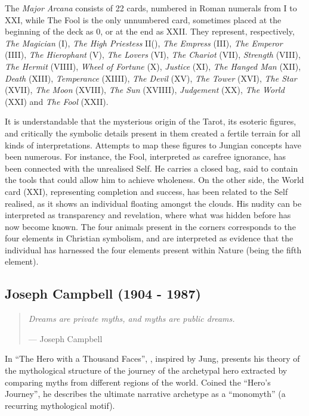 \documentclass[
]{book}
\begin{document}
The \emph{Major Arcana} consists of 22 cards, numbered in Roman numerals from I to XXI, while The Fool is the only unnumbered card, sometimes placed at the beginning of the deck as 0, or at the end as XXII. They represent, respectively, \emph{The Magician} (I), \emph{The High Priestess} II(), \emph{The Empress} (III), \emph{The Emperor} (IIII), \emph{The Hierophant} (V), \emph{The Lovers} (VI), \emph{The Chariot} (VII), \emph{Strength} (VIII), \emph{The Hermit} (VIIII), \emph{Wheel of Fortune} (X), \emph{Justice} (XI), \emph{The Hanged Man} (XII), \emph{Death} (XIII), \emph{Temperance} (XIIII), \emph{The Devil} (XV), \emph{The Tower} (XVI), \emph{The Star} (XVII), \emph{The Moon} (XVIII), \emph{The Sun} (XVIIII), \emph{Judgement} (XX), \emph{The World} (XXI) and \emph{The Fool} (XXII).

It is understandable that the mysterious origin of the Tarot, its esoteric figures, and critically the symbolic details present in them created a fertile terrain for all kinds of interpretations. Attempts to map these figures to Jungian concepts have been numerous. For instance, the Fool, interpreted as carefree ignorance, has been connected with the unrealised Self. He carries a closed bag, said to contain the tools that could allow him to achieve wholeness. On the other side, the World card (XXI), representing completion and success, has been related to the Self realised, as it shows an individual floating amongst the clouds. His nudity can be interpreted as transparency and revelation, where what was hidden before has now become known. The four animals present in the corners corresponds to the four elements in Christian symbolism, and are interpreted as evidence that the individual has harnessed the four elements present within Nature (being the fifth element).

\hypertarget{joseph-campbell-1904---1987}{%
\subsection{Joseph Campbell (1904 - 1987)}\label{joseph-campbell-1904---1987}}

\begin{quote}
\emph{Dreams are private myths, and myths are public dreams.}

\hfill --- Joseph Campbell
\end{quote}

In ``The Hero with a Thousand Faces'', \citet{campbell1949hero}, inspired by Jung, presents his theory of the mythological structure of the journey of the archetypal hero extracted by comparing myths from different regions of the world. Coined the ``Hero's Journey'', he describes the ultimate narrative archetype as a ``monomyth'' (a recurring mythological motif).
\end{document}
